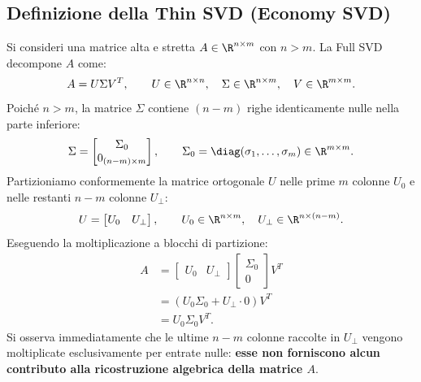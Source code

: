 \subsection{Definizione della Thin SVD (Economy SVD)}

Si consideri una matrice alta e stretta $A \in \R^{n \times m}$ con $n > m$. La Full SVD decompone $A$ come:
\begin{equation}
    A = U \Sigma V^T, \qquad U \in \R^{n \times n}, \quad \Sigma \in \R^{n \times m}, \quad V \in \R^{m \times m}.
\end{equation}
Poich\'e $n > m$, la matrice $\Sigma$ contiene $(n - m)$ righe identicamente nulle nella parte inferiore:
\begin{equation}
    \Sigma = \begin{bmatrix} \Sigma_0 \\ 0_{(n-m) \times m} \end{bmatrix}, \qquad \Sigma_0 = \diag(\sigma_1, \dots, \sigma_m) \in \R^{m \times m}.
\end{equation}
Partizioniamo conformemente la matrice ortogonale $U$ nelle prime $m$ colonne $U_0$ e nelle restanti $n - m$ colonne $U_\perp$:
\begin{equation}
    U = \begin{bmatrix} U_0 & U_\perp \end{bmatrix}, \qquad U_0 \in \R^{n \times m}, \quad U_\perp \in \R^{n \times (n - m)}.
\end{equation}
Eseguendo la moltiplicazione a blocchi di partizione:
\begin{align}
    A &= \begin{bmatrix} U_0 & U_\perp \end{bmatrix} \begin{bmatrix} \Sigma_0 \\ 0 \end{bmatrix} V^T \nonumber \\
      &= \left( U_0 \Sigma_0 + U_\perp \cdot 0 \right) V^T \nonumber \\
      &= U_0 \Sigma_0 V^T.
\end{align}
Si osserva immediatamente che le ultime $n - m$ colonne raccolte in $U_\perp$ vengono moltiplicate esclusivamente per entrate nulle: \textbf{esse non forniscono alcun contributo alla ricostruzione algebrica della matrice $A$}.

